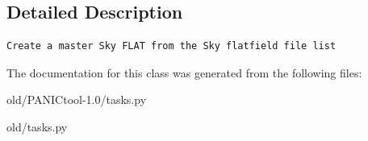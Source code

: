 \subsection{Detailed Description}


\footnotesize\begin{verbatim}Create a master Sky FLAT from the Sky flatfield file list
\end{verbatim}
\normalsize
 



The documentation for this class was generated from the following files:\begin{CompactItemize}
\item 
old/PANICtool-1.0/tasks.py\item 
old/tasks.py\end{CompactItemize}
